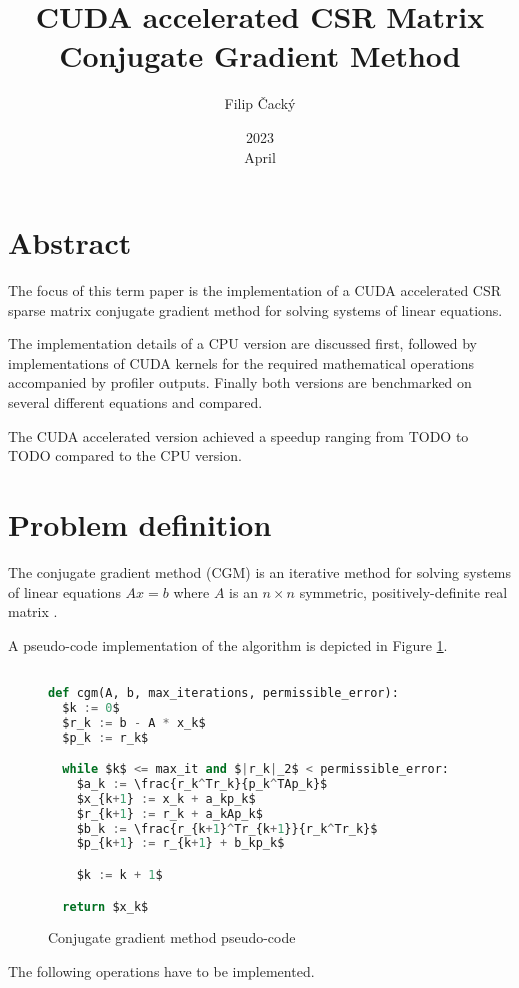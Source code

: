\documentclass{article}
\title{CUDA accelerated CSR Matrix Conjugate Gradient Method}
\author{Filip Čacký}
\date{2023\\ April}
\begin{document}
\maketitle

\section{Abstract}
The focus of this term paper is the implementation of a CUDA accelerated CSR sparse matrix
conjugate gradient method for solving systems of linear equations.

The implementation details of a CPU version are discussed first,
followed by implementations of CUDA kernels for the required mathematical operations
accompanied by profiler outputs.
Finally both versions are benchmarked on several different equations and compared.

The CUDA accelerated version achieved a speedup ranging from TODO to TODO
compared to the CPU version.

\section{Problem definition}
The conjugate gradient method (CGM) is an iterative method for solving systems of linear equations $Ax = b$
where $A$ is an $n\times n$ symmetric, positively-definite real matrix \cite{wiki_cgm}.

A pseudo-code implementation of the algorithm is depicted in Figure \ref{code:cgm_pseudo}.

\begin{figure}[H]
\begin{lstlisting}[language=Python,mathescape=true]

def cgm(A, b, max_iterations, permissible_error):
  $k := 0$
  $r_k := b - A * x_k$
  $p_k := r_k$

  while $k$ <= max_it and $|r_k|_2$ < permissible_error: 
    $a_k := \frac{r_k^Tr_k}{p_k^TAp_k}$
    $x_{k+1} := x_k + a_kp_k$
    $r_{k+1} := r_k + a_kAp_k$
    $b_k := \frac{r_{k+1}^Tr_{k+1}}{r_k^Tr_k}$
    $p_{k+1} := r_{k+1} + b_kp_k$

    $k := k + 1$

  return $x_k$

\end{lstlisting}
\caption{Conjugate gradient method pseudo-code \cite{wiki_cgm}}
\label{code:cgm_pseudo}
\end{figure}

The following operations have to be implemented.
\end{document}

